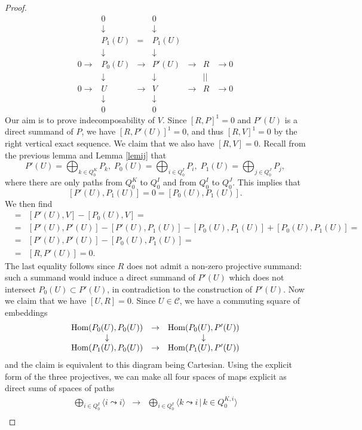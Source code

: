 \documentclass{amsart}
\numberwithin{equation}{section}
\theoremstyle{remark}
\begin{document}
\begin{proof}
$$\begin{array}{ccccccc}
&0&&0&&&\\ &\downarrow&&\downarrow&&&\\ &P_1(U)&=&P_1(U)&&&\\
&\downarrow&&\downarrow&&&\\
0\rightarrow&P_0(U)&\rightarrow&P'(U)&\rightarrow&R&\rightarrow 0\\
&\downarrow&&\downarrow&&||&\\
0\rightarrow&U&\rightarrow&V&\rightarrow&R&\rightarrow 0\\
&\downarrow&&\downarrow&&&\\ &0&&0&&&\end{array}$$
Our aim is to prove indecomposability of $V$. Since $[R,P]^1=0$ and $P'(U)$ is a direct summand of $P$, we have $[R,P'(U)]^1=0$, and thus $[R,V]^1=0$ by the right vertical exact sequence. We claim that we also have $[R,V]=0$. Recall from the previous lemma and Lemma \ref{lemij} that 
$$P'(U)=\bigoplus_{k\in Q_0^K}P_k,\; P_0(U)=\bigoplus_{i\in Q_0^I}P_i,\; P_1(U)=\bigoplus_{j\in Q_0^J}P_j,$$
where there are only paths from $Q_0^K$ to $Q_0^I$ and from $Q_0^I$ to $Q_0^J$. This implies that 
$$[P'(U),P_1(U)]=0=[P_0(U),P_1(U)].$$
We then find
\begin{eqnarray*}
[R,V]&=&[P'(U),V]-[P_0(U),V]=\\
&=&[P'(U),P'(U)]-[P'(U),P_1(U)]-[P_0(U),P_1(U)]+[P_0(U),P_1(U)]=\\
&=&[P'(U),P'(U)]-[P_0(U),P_1(U)]=\\
&=&[R,P'(U)]=0.\end{eqnarray*}
The last equality follows since $R$ does not admit a non-zero projective summand: such a summand would induce a direct summand of $P'(U)$ which does not intersect $P_0(U)\subset P'(U)$, in contradiction to the construction of $P'(U)$.
Now we claim that we have $[U,R]=0$. Since $U\in\mathcal{C}$, we have a commuting square of embeddings
$$\begin{array}{ccc}
{\rm Hom}(P_0(U),P_0(U))&\rightarrow&{\rm Hom}(P_0(U),P'(U))\\
\downarrow&&\downarrow\\
{\rm Hom}(P_1(U),P_0(U))&\rightarrow&{\rm Hom}(P_1(U),P'(U))\end{array}$$
and the claim is equivalent to this diagram being Cartesian. Using the explicit form of the three projectives, we can make all four spaces of maps explicit as direct sums of spaces of paths
$$\begin{array}{ccc}
\bigoplus_{i\in Q_0^I} \langle i\leadsto i\rangle&\rightarrow&\bigoplus_{i\in Q_0^I} \langle k\leadsto i\, |\, k\in Q_0^{K,i}\rangle\\

\end{array}$$
\end{proof}
\end{document}
